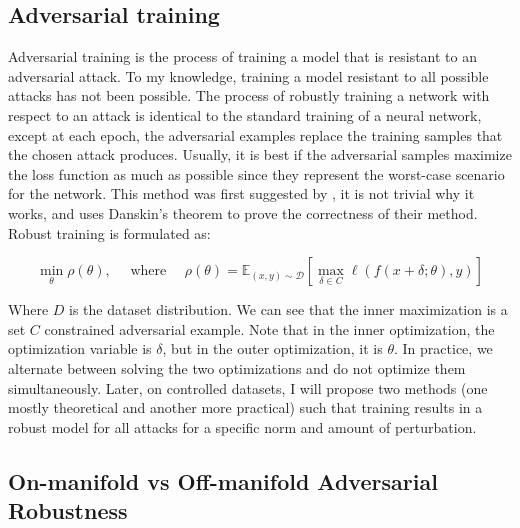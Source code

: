\documentclass[../thesis.tex]{subfiles}
\begin{document}
	\subsection{Adversarial training} 
	Adversarial training is the process of training a model that is resistant to an adversarial attack. To my knowledge, training a model resistant to all possible attacks has not been possible. The process of robustly training a network with respect to an attack is identical to the standard training of a neural network, except at each epoch, the adversarial examples replace the training samples that the chosen attack produces. Usually, it is best if the adversarial samples maximize the loss function as much as possible since they represent the worst-case scenario for the network. This method was first suggested by \cite{adv_training_madry}, it is not trivial why it works, and \cite{adv_training_madry} uses Danskin's theorem to prove the correctness of their method. Robust training is formulated as:
	
	\begin{equation}
	\min _{\theta} \rho(\theta), \quad \text { where } \quad \rho(\theta)=\mathbb{E}_{(x, y) \sim \mathcal{D}}\left[\max _{\delta \in C} \ell(f(x+\delta;\theta),y)\right]
	\end{equation}
	
	Where $D$ is the dataset distribution. We can see that the inner maximization is a set $C$ constrained adversarial example. Note that in the inner optimization, the optimization variable is $\delta$, but in the outer optimization, it is $\theta$. In practice, we alternate between solving the two optimizations and do not optimize them simultaneously. Later, on controlled datasets, I will propose two methods (one mostly theoretical and another more practical) such that training results in a robust model for all attacks for a specific norm and amount of perturbation.    
	
	
	\subsection{On-manifold vs Off-manifold Adversarial Robustness}
	
\end{document}

